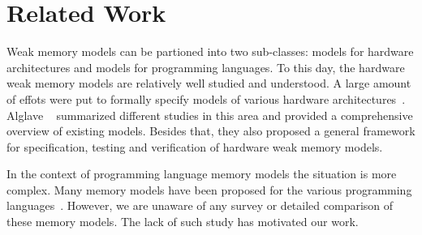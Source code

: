 \section{Related Work}

Weak memory models can be partioned into two sub-classes: 
models for hardware architectures and models for programming languages. 
To this day, the hardware weak memory models are relatively well studied and understood.
A large amount of effots were put to formally specify models of various 
hardware architectures~\cite{Chong-ASPLOS08, Alglave-DAMP09, Sewell-al:CACM10, Sarkar-al:PLDI11, Flur-al:POPL16}.
Alglave \etal~\cite{Alglave-al:TOPLAS14} summarized different studies in this area 
and provided a comprehensive overview of existing models.  
Besides that, they also proposed a general framework for specification, 
testing and verification of hardware weak memory models.

In the context of programming language memory models the situation is more complex. 
Many memory models have been proposed for the various programming languages~\cite{
Manson-al:POPL05, Batty-al:POPL11, Batty-el:POPL16, 
Dolan-al:PLDI18, Watt-el:OOPSLA19, Watt-el:PLDI2020, 
Jeffrey-Riely:LICS16, PichonPharabod-Sewell:POPL16, 
Podkopaev-al:CoRR16, Kang-al:POPL17, Chakraborty-Vafeiadis:POPL19, 
Paviotti-el:ESOP20, Lee-el:PLDI20}.
However, we are unaware of any survey or detailed comparison of these memory models.
The lack of such study has motivated our work.

